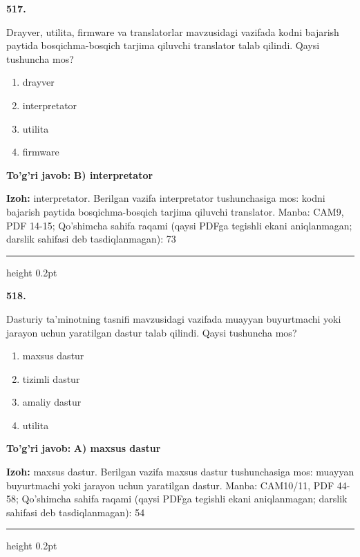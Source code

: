 \documentclass[10pt,a4paper]{article}
\begin{document}
{\bfseries\sffamily\color{ink} 517.}
\par
Drayver, utilita, firmware va translatorlar mavzusidagi vazifada kodni bajarish paytida bosqichma-bosqich tarjima qiluvchi translator talab qilindi. Qaysi tushuncha mos?
\begin{enumerate}[label=\Alph*),leftmargin=9mm]
\item drayver
\item interpretator
\item utilita
\item firmware
\end{enumerate}
\begin{tcolorbox}[enhanced,breakable,colback=teal!4,colframe=teal!60!black,boxrule=0.45pt,arc=1.2mm,left=2.7mm,right=2.7mm,top=1.8mm,bottom=1.8mm,before skip=2mm,after skip=2mm]
{\bfseries\sffamily\color{teal}To'g'ri javob:} \textbf{B) interpretator}
\par\smallskip
{\bfseries Izoh:} interpretator. Berilgan vazifa interpretator tushunchasiga mos: kodni bajarish paytida bosqichma-bosqich tarjima qiluvchi translator. Manba: CAM9, PDF 14-15; Qo'shimcha sahifa raqami (qaysi PDFga tegishli ekani aniqlanmagan; darslik sahifasi deb tasdiqlanmagan): 73
\end{tcolorbox}
\vspace{2mm}\hrule height 0.2pt\vspace{3mm}

{\bfseries\sffamily\color{ink} 518.}
\par
Dasturiy ta'minotning tasnifi mavzusidagi vazifada muayyan buyurtmachi yoki jarayon uchun yaratilgan dastur talab qilindi. Qaysi tushuncha mos?
\begin{enumerate}[label=\Alph*),leftmargin=9mm]
\item maxsus dastur
\item tizimli dastur
\item amaliy dastur
\item utilita
\end{enumerate}
\begin{tcolorbox}[enhanced,breakable,colback=teal!4,colframe=teal!60!black,boxrule=0.45pt,arc=1.2mm,left=2.7mm,right=2.7mm,top=1.8mm,bottom=1.8mm,before skip=2mm,after skip=2mm]
{\bfseries\sffamily\color{teal}To'g'ri javob:} \textbf{A) maxsus dastur}
\par\smallskip
{\bfseries Izoh:} maxsus dastur. Berilgan vazifa maxsus dastur tushunchasiga mos: muayyan buyurtmachi yoki jarayon uchun yaratilgan dastur. Manba: CAM10/11, PDF 44-58; Qo'shimcha sahifa raqami (qaysi PDFga tegishli ekani aniqlanmagan; darslik sahifasi deb tasdiqlanmagan): 54
\end{tcolorbox}
\vspace{2mm}\hrule height 0.2pt\vspace{3mm}
\end{document}

